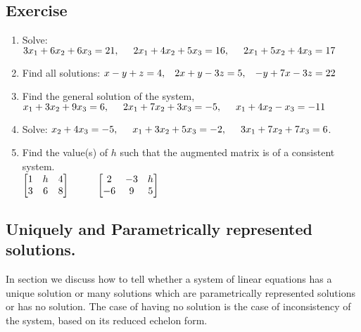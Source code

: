 \documentclass[aima104_lecturenotes_ku.tex]{subfiles}
\begin{document}
\subsection{Exercise}
\begin{enumerate}
    \item Solve: \hspace{2mm} $3x_1+6x_2+6x_3=21, \hspace{5mm} 2x_1+4x_2+5x_3=16, \hspace{5mm}
    2x_1+5x_2+4x_3=17$

    \item Find all solutions: \hspace{2mm} $x-y+z=4, \hspace{3mm} 2x+y-3z=5, \hspace{3mm} -y+7x-3z=22$

    \item Find the general solution of the system,
    $x_1+3x_2+9x_3=6, \hspace{5mm}
    2x_1+7x_2+3x_3=-5, \hspace{5mm}
    x_1+4x_2-x_3=-11$

  \item Solve: \hspace{2mm} $x_2+4x_3 = -5, \hspace{5mm} x_1+3x_2+5x_3 = -2, \hspace{5mm} 3x_1 + 7x_2 + 7x_3 = 6$.

  \item Find the value(s) of $h$ such that the augmented matrix is of a consistent system. \\[1mm]
    $ \begin{bmatrix}
      1 & h & 4 \\
      3 & 6 & 8
    \end{bmatrix} \hspace{10mm}
    \begin{bmatrix}
      2 & -3 & h \\
      -6 & 9 & 5
    \end{bmatrix}
    $
\end{enumerate}
\subsection{Uniquely and Parametrically represented solutions.}
In section we discuss how to tell whether a system of linear equations has a unique solution or many solutions which are parametrically represented solutions or has no solution. The case of having no solution is the case of inconsistency of the system, based on its reduced echelon form.
\end{document}
